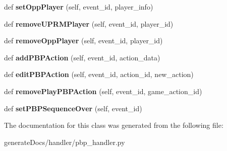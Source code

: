 \begin{DoxyCompactItemize}
\mbox{\label{classpbp__handler_1_1_volleyball_p_b_p_handler_a4749df9acc5fd4bd18bfdbcf1d61e7ab}} 
def {\bfseries set\+Opp\+Player} (self, event\+\_\+id, player\+\_\+info)
\item 
\mbox{\label{classpbp__handler_1_1_volleyball_p_b_p_handler_a1dd15c825667625826772780fd155575}} 
def {\bfseries remove\+U\+P\+R\+M\+Player} (self, event\+\_\+id, player\+\_\+id)
\item 
\mbox{\label{classpbp__handler_1_1_volleyball_p_b_p_handler_ad152781946f9801f441594bca3d5cf1c}} 
def {\bfseries remove\+Opp\+Player} (self, event\+\_\+id, player\+\_\+id)
\item 
\mbox{\label{classpbp__handler_1_1_volleyball_p_b_p_handler_a3cf0b05e76dbeceefb528ea82272164b}} 
def {\bfseries add\+P\+B\+P\+Action} (self, event\+\_\+id, action\+\_\+data)
\item 
\mbox{\label{classpbp__handler_1_1_volleyball_p_b_p_handler_a7d4b8f6b3e7bb546ecbfef399752db26}} 
def {\bfseries edit\+P\+B\+P\+Action} (self, event\+\_\+id, action\+\_\+id, new\+\_\+action)
\item 
\mbox{\label{classpbp__handler_1_1_volleyball_p_b_p_handler_a1b8e0d4756608f8fb793838759354c43}} 
def {\bfseries remove\+Play\+P\+B\+P\+Action} (self, event\+\_\+id, game\+\_\+action\+\_\+id)
\item 
\mbox{\label{classpbp__handler_1_1_volleyball_p_b_p_handler_ae6c509a69790ac6a0670b2e64d13228a}} 
def {\bfseries set\+P\+B\+P\+Sequence\+Over} (self, event\+\_\+id)
\end{DoxyCompactItemize}


The documentation for this class was generated from the following file\+:\begin{DoxyCompactItemize}
\item 
generate\+Docs/handler/pbp\+\_\+handler.\+py\end{DoxyCompactItemize}
